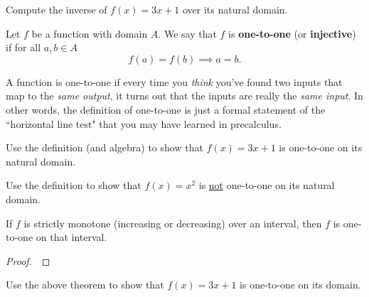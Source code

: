 \newpage

\begin{example}
Compute the inverse of $f(x)=3x+1$ over its natural domain.
\end{example}

\newpage

\begin{definition}
Let $f$ be a function with domain $A$.
We say that $f$ is \textbf{one-to-one} (or \textbf{injective}) if for all $a,b\in A$
\begin{equation*}
f(a)=f(b)\implies a=b.
\end{equation*}
\end{definition}

\begin{remark}
A function is one-to-one if every time you \textit{think} you've found two inputs that map to the \textit{same output}, it turns out that the inputs are really the \textit{same input}.
In other words, the definition of one-to-one is just a formal statement of the ``horizontal line test" that you may have learned in precalculus.
\end{remark}

\begin{example}
Use the definition (and algebra) to show that $f(x)=3x+1$ is one-to-one on its natural domain.
\end{example}

\vfill

\begin{example}
Use the definition to show that $f(x)=x^2$ is \underline{not} one-to-one on its natural domain.
\end{example}

\vfill

\newpage

\begin{theorem}
If $f$ is strictly monotone (increasing or decreasing) over an interval, then $f$ is one-to-one on that interval.
\end{theorem}
\begin{proof}\,

\vspace{3.5in}

\end{proof}


\begin{example}
Use the above theorem to show that $f(x)=3x+1$ is one-to-one on its domain.
\end{example}

